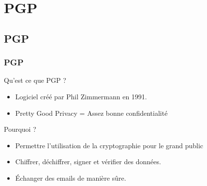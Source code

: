 \section{PGP}
\subsection{PGP}
\begin{frame}
    \frametitle{\color{white}PGP}
    \begin{block}{Qu'est ce que PGP ?}
    	\begin{itemize}
    	 \item Logiciel créé par Phil Zimmermann en 1991.
         \item Pretty Good Privacy = Assez bonne confidentialité
       \end{itemize} 
    \end{block}
    \begin{block}{Pourquoi ?}
    	\begin{itemize}
         \item Permettre l'utilisation de la cryptographie pour le grand public
         \item Chiffrer, déchiffrer, signer et vérifier des données. 
         \item Échanger des emails de manière sûre.
       \end{itemize} 
    \end{block}
\end{frame}
